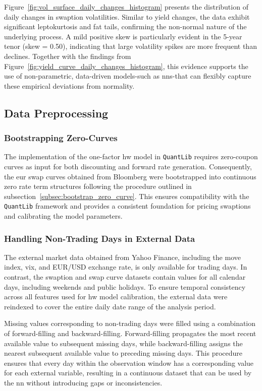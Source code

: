Figure~\ref{fig:vol_surface_daily_changes_histogram} presents the distribution of daily changes in swaption volatilities. Similar to yield changes, the data exhibit significant leptokurtosis and fat tails, confirming the non-normal nature of the underlying process. A mild positive skew is particularly evident in the 5-year tenor (skew = 0.50), indicating that large volatility spikes are more frequent than declines. Together with the findings from Figure~\ref{fig:yield_curve_daily_changes_histogram}, this evidence supports the use of non-parametric, data-driven models-such as \ac{nn}s-that can flexibly capture these empirical deviations from normality.

\subsection{Data Preprocessing}
\subsubsection{Bootstrapping Zero-Curves}
The implementation of the one-factor \ac{hw} model in \texttt{QuantLib} requires zero-coupon curves as input for both discounting and forward rate generation. Consequently, the \ac{eur} swap curves obtained from Bloomberg were bootstrapped into continuous zero rate term structures following the procedure outlined in subsection~\ref{subsec:bootstrap_zero_curve}. This ensures compatibility with the \texttt{QuantLib} framework and provides a consistent foundation for pricing swaptions and calibrating the model parameters.

\subsubsection{Handling Non-Trading Days in External Data}
The external market data obtained from Yahoo Finance, including the \ac{move} index, \ac{vix}, and EUR/USD exchange rate, is only available for trading days. In contrast, the swaption and swap curve datasets contain values for all calendar days, including weekends and public holidays. To ensure temporal consistency across all features used for \ac{hw} model calibration, the external data were reindexed to cover the entire daily date range of the analysis period.

Missing values corresponding to non-trading days were filled using a combination of forward-filling and backward-filling. Forward-filling propagates the most recent available value to subsequent missing days, while backward-filling assigns the nearest subsequent available value to preceding missing days. This procedure ensures that every day within the observation window has a corresponding value for each external variable, resulting in a continuous dataset that can be used by the \ac{nn} without introducing gaps or inconsistencies.

